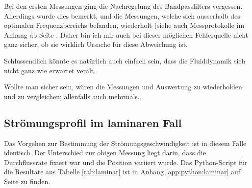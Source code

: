 Bei  den   ersten  Messungen   ging  die  Nachregelung    des  Bandpassfilters
vergessen. Allerdings  wurde  dies bemerkt,  und  die  Messungen, welche  sich
ausserhalb  des optimalen  Frequenzbereichs befanden,  wiederholt (siehe  auch
Messprotokolle im Anhang ab  Seite \pageref{app:messprotokolle}. Daher bin ich
mir  auch  bei dieser  m\"oglichen  Fehlerquelle  nicht  ganz sicher,  ob  sie
wirklich Ursache f\"ur diese Abweichung ist.

Schlussendlich   k\"onnte  es   nat\"urlich  auch   einfach  sein,   dass  die
Fluiddynamik sich nicht ganz wie erwartet ver\"alt.

Wollte man sicher  sein, w\"aren die Messungen und  Auswertung zu wiederholden
und zu vergleichen; allenfalls auch mehrmals.


\clearpage
\subsection{Str\"omungsprofil im laminaren Fall}
\label{subsec:profil:laminar}

Das  Vorgehen  zur Bestimmung  der  Str\"omungsgeschwindigkeit  ist in  diesem
Falle  identisch. Der  Unterschied  zur   obigen  Messung  liegt  darin,  dass
die  Durchflussrate   fixiert  war   und  die  Position   variiert  wurde. Das
Python-Script f\"ur die Resultate aus  Tabelle \ref{tab:laminar} ist in Anhang
\ref{app:python:laminar} auf Seite \pageref{app:python:laminar} zu finden.

